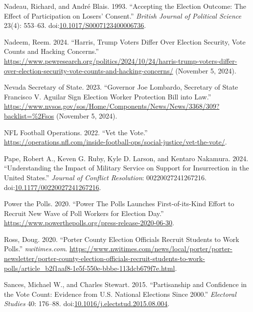 \documentclass[
  11pt,
  a4paper,
]{scrartcl}
\newlength{\cslhangindent}
\newenvironment{CSLReferences}[2] %
 {\begin{list}{}{%
  \setlength{\itemindent}{0pt}
  \setlength{\leftmargin}{0pt}
  \setlength{\parsep}{0pt}
  \ifodd #1
   \setlength{\leftmargin}{\cslhangindent}
   \setlength{\itemindent}{-1\cslhangindent}
  \fi
  \setlength{\itemsep}{#2\baselineskip}}}
 {\end{list}}
\begin{document}
\begin{CSLReferences}{1}{1}
Nadeau, Richard, and André Blais. 1993. {``Accepting the {Election
Outcome}: {The Effect} of {Participation} on {Losers}' {Consent}.''}
\emph{British Journal of Political Science} 23(4): 553--63.
doi:\href{https://doi.org/10.1017/S0007123400006736}{10.1017/S0007123400006736}.

Nadeem, Reem. 2024. {``Harris, {Trump Voters Differ Over Election
Security}, {Vote Counts} and {Hacking Concerns}.''}
\url{https://www.pewresearch.org/politics/2024/10/24/harris-trump-voters-differ-over-election-security-vote-counts-and-hacking-concerns/}
(November 5, 2024).

Nevada Secretary of State. 2023. {``Governor {Joe Lombardo}, {Secretary}
of {State Francisco V}. {Aguilar} Sign {Election Worker Protection Bill}
into Law.''}
\url{https://www.nvsos.gov/sos/Home/Components/News/News/3368/309?backlist=\%2Fsos}
(November 5, 2024).

NFL Football Operations. 2022. {``Vet the {Vote}.''}
\url{https://operations.nfl.com/inside-football-ops/social-justice/vet-the-vote/}.

Pape, Robert A., Keven G. Ruby, Kyle D. Larson, and Kentaro Nakamura.
2024. {``Understanding the {Impact} of {Military Service} on {Support}
for {Insurrection} in the {United States}.''} \emph{Journal of Conflict
Resolution}: 00220027241267216.
doi:\href{https://doi.org/10.1177/00220027241267216}{10.1177/00220027241267216}.

Power the Polls. 2020. {``Power {The Polls Launches First-of-its-Kind
Effort} to {Recruit New Wave} of {Poll Workers} for {Election Day}.''}
\url{https://www.powerthepolls.org/press-release-2020-06-30}.

Ross, Doug. 2020. {``Porter {County} Election Officials Recruit Students
to Work Polls.''} \emph{nwitimes.com}.
\url{https://www.nwitimes.com/news/local/porter/porter-newsletter/porter-county-election-officials-recruit-students-to-work-polls/article_b2f1aaf8-1e5f-550e-bbbe-113dcb679f7e.html}.

Sances, Michael W., and Charles Stewart. 2015. {``Partisanship and
Confidence in the Vote Count: {Evidence} from {U}.{S}. National
Elections Since 2000.''} \emph{Electoral Studies} 40: 176--88.
doi:\href{https://doi.org/10.1016/j.electstud.2015.08.004}{10.1016/j.electstud.2015.08.004}.


\end{CSLReferences}
\end{document}

